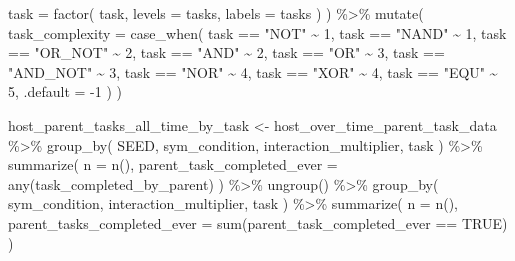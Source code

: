 \documentclass[
]{book}
\newenvironment{Shaded}{\begin{snugshade}}{\end{snugshade}}
\newcommand{\AttributeTok}[1]{\textcolor[rgb]{0.77,0.63,0.00}{#1}}
\newcommand{\ConstantTok}[1]{\textcolor[rgb]{0.00,0.00,0.00}{#1}}
\newcommand{\DecValTok}[1]{\textcolor[rgb]{0.00,0.00,0.81}{#1}}
\newcommand{\FunctionTok}[1]{\textcolor[rgb]{0.00,0.00,0.00}{#1}}
\newcommand{\NormalTok}[1]{#1}
\newcommand{\OtherTok}[1]{\textcolor[rgb]{0.56,0.35,0.01}{#1}}
\newcommand{\SpecialCharTok}[1]{\textcolor[rgb]{0.00,0.00,0.00}{#1}}
\newcommand{\StringTok}[1]{\textcolor[rgb]{0.31,0.60,0.02}{#1}}
\begin{document}
\begin{Shaded}
\begin{Highlighting}[]
    \AttributeTok{task =} \FunctionTok{factor}\NormalTok{(}
\NormalTok{      task,}
      \AttributeTok{levels =}\NormalTok{ tasks,}
      \AttributeTok{labels =}\NormalTok{ tasks}
\NormalTok{    )}
\NormalTok{  ) }\SpecialCharTok{\%\textgreater{}\%}
  \FunctionTok{mutate}\NormalTok{(}
    \AttributeTok{task\_complexity =} \FunctionTok{case\_when}\NormalTok{(}
\NormalTok{      task }\SpecialCharTok{==} \StringTok{"NOT"} \SpecialCharTok{\textasciitilde{}} \DecValTok{1}\NormalTok{,}
\NormalTok{      task }\SpecialCharTok{==} \StringTok{"NAND"} \SpecialCharTok{\textasciitilde{}} \DecValTok{1}\NormalTok{,}
\NormalTok{      task }\SpecialCharTok{==} \StringTok{"OR\_NOT"} \SpecialCharTok{\textasciitilde{}} \DecValTok{2}\NormalTok{,}
\NormalTok{      task }\SpecialCharTok{==} \StringTok{"AND"} \SpecialCharTok{\textasciitilde{}} \DecValTok{2}\NormalTok{,}
\NormalTok{      task }\SpecialCharTok{==} \StringTok{"OR"} \SpecialCharTok{\textasciitilde{}} \DecValTok{3}\NormalTok{,}
\NormalTok{      task }\SpecialCharTok{==} \StringTok{"AND\_NOT"} \SpecialCharTok{\textasciitilde{}} \DecValTok{3}\NormalTok{,}
\NormalTok{      task }\SpecialCharTok{==} \StringTok{"NOR"} \SpecialCharTok{\textasciitilde{}} \DecValTok{4}\NormalTok{,}
\NormalTok{      task }\SpecialCharTok{==} \StringTok{"XOR"} \SpecialCharTok{\textasciitilde{}} \DecValTok{4}\NormalTok{,}
\NormalTok{      task }\SpecialCharTok{==} \StringTok{"EQU"} \SpecialCharTok{\textasciitilde{}} \DecValTok{5}\NormalTok{,}
      \AttributeTok{.default =} \SpecialCharTok{{-}}\DecValTok{1}
\NormalTok{    )}
\NormalTok{  )}

\NormalTok{host\_parent\_tasks\_all\_time\_by\_task }\OtherTok{\textless{}{-}}\NormalTok{ host\_over\_time\_parent\_task\_data }\SpecialCharTok{\%\textgreater{}\%}
  \FunctionTok{group\_by}\NormalTok{(}
\NormalTok{    SEED,}
\NormalTok{    sym\_condition,}
\NormalTok{    interaction\_multiplier,}
\NormalTok{    task}
\NormalTok{  ) }\SpecialCharTok{\%\textgreater{}\%}
  \FunctionTok{summarize}\NormalTok{(}
    \AttributeTok{n =} \FunctionTok{n}\NormalTok{(),}
    \AttributeTok{parent\_task\_completed\_ever =} \FunctionTok{any}\NormalTok{(task\_completed\_by\_parent)}
\NormalTok{  ) }\SpecialCharTok{\%\textgreater{}\%}
  \FunctionTok{ungroup}\NormalTok{() }\SpecialCharTok{\%\textgreater{}\%}
  \FunctionTok{group\_by}\NormalTok{(}
\NormalTok{    sym\_condition,}
\NormalTok{    interaction\_multiplier,}
\NormalTok{    task}
\NormalTok{  ) }\SpecialCharTok{\%\textgreater{}\%}
  \FunctionTok{summarize}\NormalTok{(}
    \AttributeTok{n =} \FunctionTok{n}\NormalTok{(),}
    \AttributeTok{parent\_tasks\_completed\_ever =} \FunctionTok{sum}\NormalTok{(parent\_task\_completed\_ever }\SpecialCharTok{==} \ConstantTok{TRUE}\NormalTok{)}
\NormalTok{  )}
\end{Highlighting}
\end{Shaded}
\end{document}
